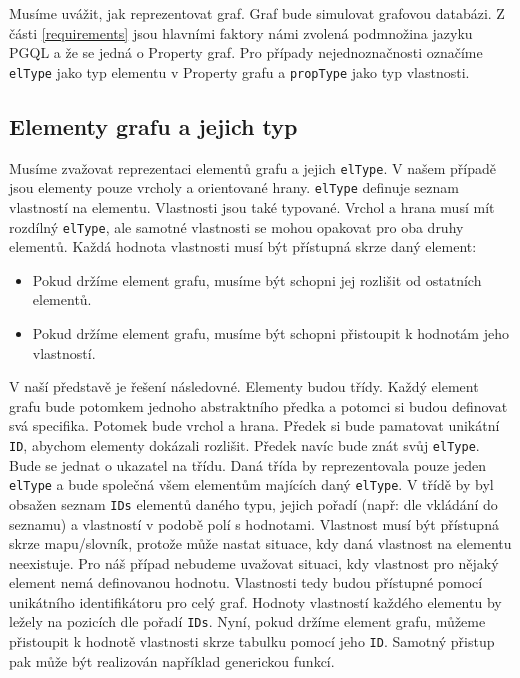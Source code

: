 Musíme uvážit, jak reprezentovat graf.
Graf bude simulovat grafovou databázi.
Z části \ref{requirements} jsou hlavními faktory námi zvolená podmnožina jazyku PGQL a že se jedná o Property graf.
Pro případy nejednoznačnosti označíme \verb+elType+ jako typ elementu v Property grafu a \verb+propType+ jako typ vlastnosti.

\subsection{Elementy grafu a jejich typ}

Musíme zvažovat reprezentaci elementů grafu a jejich \verb+elType+.
V našem případě jsou elementy pouze vrcholy a orientované hrany.
\verb+elType+ definuje seznam vlastností na elementu. 
Vlastnosti jsou také typované.
Vrchol a hrana musí mít rozdílný \verb+elType+, ale samotné vlastnosti se mohou opakovat pro oba druhy elementů.
Každá hodnota vlastnosti musí být přístupná skrze daný element:

\begin{itemize}

\item Pokud držíme element grafu, musíme být schopni jej rozlišit od ostatních elementů.

\item Pokud držíme element grafu, musíme být schopni přistoupit k hodnotám jeho vlastností.

\end{itemize}

V naší představě je řešení následovné.
Elementy budou třídy.
Každý element grafu bude potomkem jednoho abstraktního předka a potomci si budou definovat svá specifika.
Potomek bude vrchol a hrana.
Předek si bude pamatovat unikátní \verb+ID+, abychom elementy dokázali rozlišit. 
Předek navíc bude znát svůj \verb+elType+. 
Bude se jednat o ukazatel na třídu.
Daná třída by reprezentovala pouze jeden \verb+elType+ a bude společná všem elementům majících daný \verb+elType+.
V třídě by byl obsažen seznam \verb+IDs+ elementů daného typu, jejich pořadí (např: dle vkládání do seznamu) a vlastností v podobě polí s hodnotami.
Vlastnost musí být přístupná skrze mapu/slovník, protože může nastat situace, kdy daná vlastnost na elementu neexistuje. 
Pro náš případ nebudeme uvažovat situaci, kdy vlastnost pro nějaký element nemá definovanou hodnotu.
Vlastnosti tedy budou přístupné pomocí unikátního identifikátoru pro celý graf.
Hodnoty vlastností každého elementu by ležely na pozicích dle pořadí \verb+IDs+.
Nyní, pokud držíme element grafu, můžeme přistoupit k hodnotě vlastnosti skrze tabulku pomocí jeho \verb+ID+.    
Samotný přistup pak může být realizován například generickou funkcí. 

